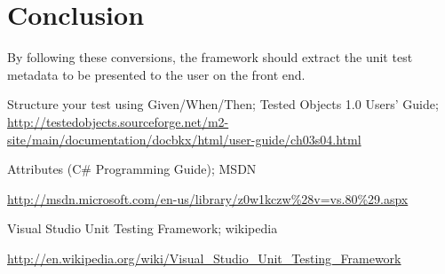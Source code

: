 \documentclass[a4paper,12pt]{article}
\begin{document}
\section{Conclusion}
By following these conversions, the framework should extract the unit test metadata to be presented to the user on the front end.


\clearpage

\begin{thebibliography}{5}
 Structure your test using Given/When/Then; Tested Objects 1.0 Users' Guide;  \url{http://testedobjects.sourceforge.net/m2-site/main/documentation/docbkx/html/user-guide/ch03s04.html}

 \begin{flushleft}
Attributes (C\# Programming Guide); MSDN 
\end{flushleft}\url{http://msdn.microsoft.com/en-us/library/z0w1kczw%28v=vs.80%29.aspx}

 \begin{flushleft}
Visual Studio Unit Testing Framework; wikipedia
\end{flushleft} \url{http://en.wikipedia.org/wiki/Visual_Studio_Unit_Testing_Framework}

\end{thebibliography}

 
\end{document}
